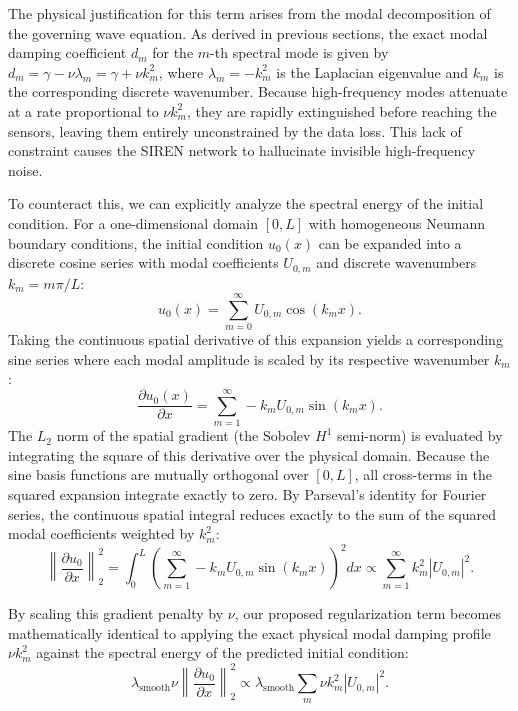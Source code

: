 \documentclass{Configuration_Files/PoliMi3i_thesis}
\begin{document}
The physical justification for this term arises from the modal decomposition of the governing wave equation. As derived in previous sections, the exact modal damping coefficient $d_m$ for the $m$-th spectral mode is given by $d_m = \gamma - \nu \lambda_m = \gamma + \nu k_m^2$, where $\lambda_m = -k_m^2$ is the Laplacian eigenvalue and $k_m$ is the corresponding discrete wavenumber. Because high-frequency modes attenuate at a rate proportional to $\nu k_m^2$, they are rapidly extinguished before reaching the sensors, leaving them entirely unconstrained by the data loss. This lack of constraint causes the SIREN network to hallucinate invisible high-frequency noise.

To counteract this, we can explicitly analyze the spectral energy of the initial condition. For a one-dimensional domain $[0, L]$ with homogeneous Neumann boundary conditions, the initial condition $u_0(x)$ can be expanded into a discrete cosine series with modal coefficients $U_{0,m}$ and discrete wavenumbers $k_m = m\pi / L$:
\begin{equation*}
u_0(x) = \sum_{m=0}^{\infty} U_{0,m} \cos(k_m x).
\end{equation*}
Taking the continuous spatial derivative of this expansion yields a corresponding sine series where each modal amplitude is scaled by its respective wavenumber $k_m$:
\begin{equation*}
\frac{\partial u_0(x)}{\partial x} = \sum_{m=1}^{\infty} -k_m U_{0,m} \sin(k_m x).
\end{equation*}
The $L_2$ norm of the spatial gradient (the Sobolev $H^1$ semi-norm) is evaluated by integrating the square of this derivative over the physical domain. Because the sine basis functions are mutually orthogonal over $[0, L]$, all cross-terms in the squared expansion integrate exactly to zero. By Parseval's identity for Fourier series, the continuous spatial integral reduces exactly to the sum of the squared modal coefficients weighted by $k_m^2$:
\begin{equation*}
\left\| \frac{\partial u_0}{\partial x} \right\|_2^2 = \int_0^L \left( \sum_{m=1}^{\infty} -k_m U_{0,m} \sin(k_m x) \right)^2 dx \propto \sum_{m=1}^{\infty} k_m^2 |U_{0,m}|^2.
\end{equation*}

By scaling this gradient penalty by $\nu$, our proposed regularization term becomes mathematically identical to applying the exact physical modal damping profile $\nu k_m^2$ against the spectral energy of the predicted initial condition:
\begin{equation*}
\lambda_{\text{smooth}} \nu \left\| \frac{\partial u_0}{\partial x} \right\|_2^2 \propto \lambda_{\text{smooth}} \sum_{m} \nu k_m^2 |U_{0,m}|^2.
\end{equation*}
\end{document}

